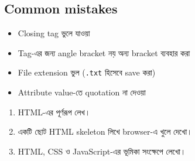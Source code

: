 \subsection{Common mistakes}
\begin{itemize}
\item Closing tag ভুলে যাওয়া
\item Tag-এর জন্য angle bracket নয় অন্য bracket ব্যবহার করা
\item File extension ভুল (\texttt{.txt} হিসেবে save করা)
\item Attribute value-তে quotation না দেওয়া
\end{itemize}

\begin{practicebox}
\begin{enumerate}
\item HTML-এর পূর্ণরূপ লেখ।
\item একটি ছোট HTML skeleton লিখে browser-এ খুলে দেখো।
\item HTML, CSS ও JavaScript-এর ভূমিকা সংক্ষেপে লেখো।
\end{enumerate}
\end{practicebox}
